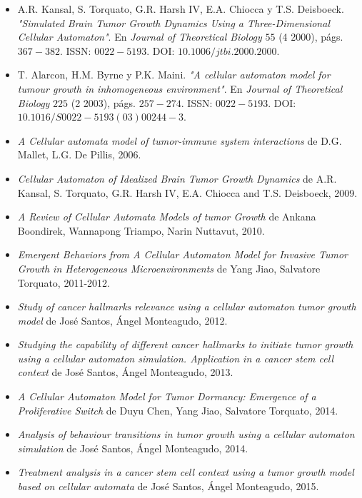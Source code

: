 \begin{itemize}
    \item A.R. Kansal, S. Torquato, G.R. Harsh IV, E.A. Chiocca y T.S. Deisboeck.
    \textit{"Simulated Brain Tumor Growth Dynamics Using a Three-Dimensional Cellular Automaton"}.
    En \textit{Journal of Theoretical Biology} $55$ (4 2000), págs. $367 - 382$. ISSN:
    $0022-5193$. DOI: $10.1006/jtbi.2000.2000$.
    \item T. Alarcon, H.M. Byrne y P.K. Maini. \textit{"}\textit{A cellular automaton model for tumour growth in inhomogeneous environment"}.
    En \textit{Journal of Theoretical Biology} $225$ (2 2003), págs. $257 - 274$. ISSN:
    $0022-5193$. DOI: $10.1016/S0022-5193(03)00244-3$.
    \item \textit{A Cellular automata model of tumor-immune system interactions}
    de D.G. Mallet, L.G. De Pillis, 2006.
    \item \textit{Cellular Automaton of Idealized Brain Tumor Growth Dynamics}
    de A.R. Kansal, S. Torquato, G.R. Harsh IV, E.A. Chiocca and T.S. Deisboeck, 2009.
    \item \textit{A Review of Cellular Automata Models of tumor Growth}
    de Ankana Boondirek, Wannapong Triampo, Narin Nuttavut, 2010.
    \item \textit{Emergent Behaviors from A Cellular Automaton Model for Invasive Tumor Growth in Heterogeneous Microenvironments}
    de Yang Jiao, Salvatore Torquato, 2011-2012.
    \item \textit{Study of cancer hallmarks relevance using a cellular automaton tumor growth model}
    de José Santos, Ángel Monteagudo, 2012.
    \item \textit{Studying the capability of different cancer hallmarks to initiate tumor growth using a cellular automaton simulation. Application in a cancer stem cell context}
    de José Santos, Ángel Monteagudo, 2013.
    \item \textit{A Cellular Automaton Model for Tumor Dormancy: Emergence of a Proliferative Switch}
    de Duyu Chen, Yang Jiao, Salvatore Torquato, 2014.
    \item \textit{Analysis of behaviour transitions in tumor growth using a cellular automaton simulation}
    de José Santos, Ángel Monteagudo, 2014.
    \item \textit{Treatment analysis in a cancer stem cell context using a tumor growth model based on cellular automata}
    de José Santos, Ángel Monteagudo, 2015.
\end{itemize}

